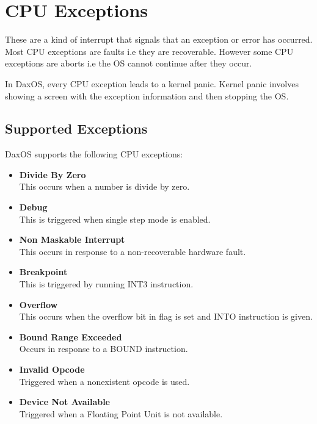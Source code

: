 \chapter{CPU Exceptions}\label{chapter:CPU Exceptions}
These are a kind of interrupt that signals that an exception or error has occurred. Most CPU exceptions are faults i.e they 
are recoverable. However some CPU exceptions are aborts i.e the OS cannot continue after they occur.

In DaxOS, every CPU exception leads to a kernel panic. Kernel panic involves showing a screen with the exception information
and then stopping the OS.

\section{Supported Exceptions}\label{section:Supported Exceptions}

DaxOS supports the following CPU exceptions:
\begin{itemize}
    \item \textbf{Divide By Zero}\\
    This occurs when a number is divide by zero.
    \item \textbf{Debug}\\
    This is triggered when single step mode is enabled.
    \item \textbf{Non Maskable Interrupt}\\
    This occurs in response to a non-recoverable hardware fault.
    \item \textbf{Breakpoint}\\
    This is triggered by running INT3 instruction.
    \item \textbf{Overflow}\\
    This occurs when the overflow bit in flag is set and INTO instruction is given.
    \item \textbf{Bound Range Exceeded}\\
    Occurs in response to a BOUND instruction.
    \item \textbf{Invalid Opcode}\\
    Triggered when a nonexistent opcode is used.
    \item \textbf{Device Not Available}\\
    Triggered when a Floating Point Unit is not available.
\end{itemize}

